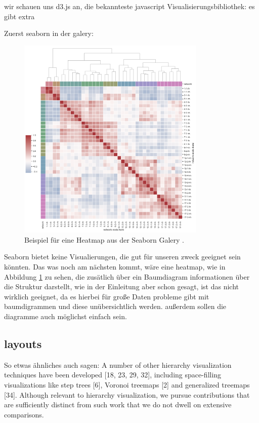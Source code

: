wir schauen uns d3.js an, die bekannteste javascript Visualisierungsbibliothek:
es gibt extra 


Zuerst seaborn in der galery: \cite{seaborngalery}
\begin{figure}
    \centering
    \includegraphics[width=0.8\textwidth]{images/structureHeatmapSeaborn.png}
    \caption{Beispiel für eine Heatmap aus der Seaborn Galery \cite{seaborngalery}.}
    \label{fig:seabornHeatmap} 
\end{figure}
Seaborn bietet keine Visualierungen, die gut für unseren zweck geeignet sein könnten. Das was noch am nächsten kommt, wäre eine heatmap, wie in Abbildung \ref{fig:seabornHeatmap} zu sehen, die zusätlich über ein Baumdiagram informationen über die Struktur darstellt, wie in der Einleitung aber schon gesagt, ist das nicht wirklich geeignet, da es hierbei für große Daten probleme gibt mit baumdigrammen und diese unübersichtlich werden.
außerdem sollen die diagramme auch möglichst einfach sein.


\subsection{layouts}

So etwas ähnliches auch sagen:
A number of other hierarchy visualization techniques have been
developed [18, 23, 29, 32], including space-filling visualizations
like step trees [6], Voronoi treemaps [2] and generalized treemaps
[34]. Although relevant to hierarchy visualization, we pursue
contributions that are sufficiently distinct from such work that we
do not dwell on extensive comparisons. \cite{lu2008cascaded}

